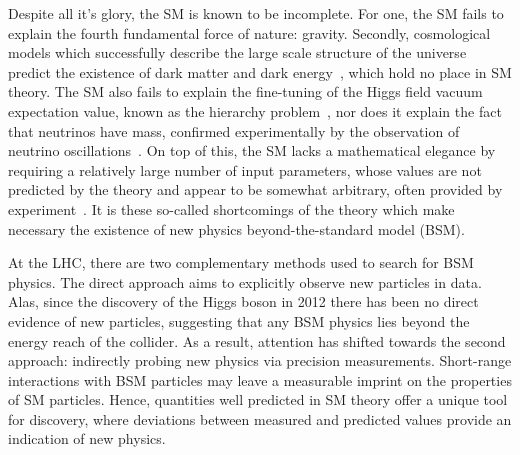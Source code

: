 Despite all it's glory, the SM is known to be incomplete. For one, the SM fails to explain the fourth fundamental force of nature: gravity. 
Secondly, cosmological models which successfully describe the large scale structure of the universe predict the existence of dark matter and dark energy~\cite{Aghanim:2018eyx}, which hold no place in SM theory. The SM also fails to explain the fine-tuning of the Higgs field vacuum expectation value, known as the hierarchy problem~\cite{PhysRevD.13.974,PhysRevD.20.2619}, nor does it explain the fact that neutrinos have mass, confirmed experimentally by the observation of neutrino oscillations~\cite{Fukuda:1998mi}. On top of this, the SM lacks a mathematical elegance by requiring a relatively large number of input parameters, whose values are not predicted by the theory and appear to be somewhat arbitrary, often provided by experiment~\cite{Zyla:2020zbs}. It is these so-called shortcomings of the theory which make necessary the existence of new physics beyond-the-standard model (BSM).

At the LHC, there are two complementary methods used to search for BSM physics. The direct approach aims to explicitly observe new particles in data. Alas, since the discovery of the Higgs boson in 2012 there has been no direct evidence of new particles, suggesting that any BSM physics lies beyond the energy reach of the collider. As a result, attention has shifted towards the second approach: indirectly probing new physics via precision measurements. Short-range interactions with BSM particles may leave a measurable imprint on the properties of SM particles. Hence, quantities well predicted in SM theory offer a unique tool for discovery, where deviations between measured and predicted values provide an indication of new physics. 

